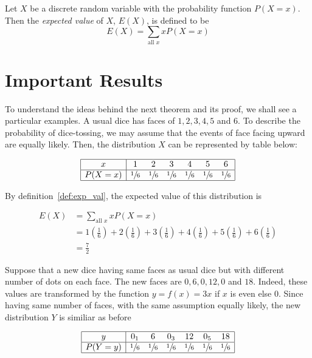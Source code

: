 \begin{definition}\label{def:exp_val}
    Let $X$ be a discrete random variable with the probability function $P(X = x)$. Then the \emph{expected value} of $X$, $E(X)$, is defined to be
    \[
        E(X) = \sum_{\text{all } x}{xP(X = x)}
    \]
\end{definition}


\section{Important Results}

To understand the ideas behind the next theorem and its proof, we shall see a particular examples. 
A usual dice has faces of $1, 2, 3, 4, 5$ and $6$.
To describe the probability of dice-tossing, we may assume that the events of face facing upward are equally likely.
Then, the distribution $X$ can be represented by table below:

\[\begin{array}{|c|cccccc|}
    \hline
    x           & 1 & 2 & 3 & 4 & 5& 6\\
    \hline 
    P(X = x)    & \sfrac{1}{6} & \sfrac{1}{6} & \sfrac{1}{6} & \sfrac{1}{6} & \sfrac{1}{6} & \sfrac{1}{6} \\
    \hline
\end{array}\]

By definition~\ref{def:exp_val}, the expected value of this distribution is 

\begin{align*}
    E(X) & = \sum_{\text{all } x}{xP(X = x)} \\
        & = 1 \left(\frac{1}{6}\right) + 
            2\left(\frac{1}{6}\right) + 
            3\left(\frac{1}{6}\right) + 
            4\left(\frac{1}{6}\right)  + 
            5\left(\frac{1}{6}\right) + 
            6\left(\frac{1}{6}\right) \\
        & = \frac{7}{2}
\end{align*}

Suppose that a new dice having same faces as usual dice but with different number of dots on each face. 
The new faces are $0, 6, 0, 12, 0$ and $18$.
Indeed, these values are transformed by the function $y = f(x) = 3x$ if $x$ is even else $0$.
Since having same number of faces, with the same assumption equally likely,
the new distribution $Y$ is similiar as before

\[\begin{array}{|c|cccccc|}
    \hline
    y           & 0_1 & 6 & 0_3 & 12 & 0_5 & 18\\
    \hline 
    P(Y = y)    & \sfrac{1}{6} & \sfrac{1}{6} & \sfrac{1}{6} & \sfrac{1}{6} & \sfrac{1}{6} & \sfrac{1}{6} \\
    \hline
\end{array}\]

